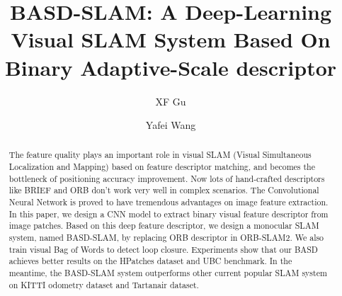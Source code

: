 \documentclass{svproc}
\begin{document}
\mainmatter              %
%
\title{BASD-SLAM: A Deep-Learning Visual SLAM System Based On Binary Adaptive-Scale descriptor}
%
%
\author{XF Gu \and Yafei Wang}
%
%
%


\maketitle              %


\begin{abstract}
The feature quality plays an important role in visual SLAM (Visual Simultaneous Localization and Mapping) based on feature descriptor matching, and becomes the bottleneck of positioning accuracy improvement. Now lots of hand-crafted descriptors like BRIEF and ORB don't work very well in complex scenarios. The Convolutional Neural Network is proved to have tremendous advantages on image feature extraction. In this paper, we design a CNN model to extract binary visual feature descriptor from image patches. Based on this deep feature descriptor, we design a monocular SLAM system, named BASD-SLAM, by replacing ORB descriptor in ORB-SLAM2. We also train visual Bag of Words to detect loop closure. Experiments show that our BASD achieves better results on the HPatches dataset and UBC benchmark. In the meantime, the BASD-SLAM system outperforms other current popular SLAM system on KITTI odometry dataset and Tartanair dataset.

\end{abstract}




\end{document}
